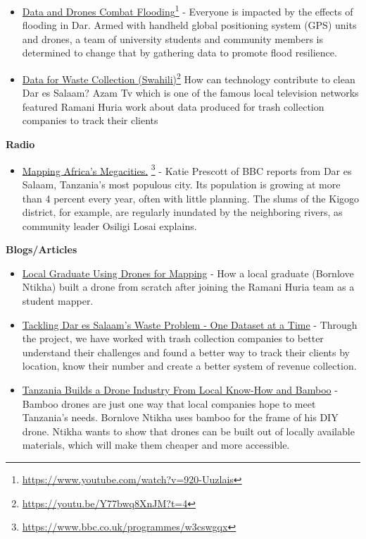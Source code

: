 \documentclass[a4paper,12pt,twoside]{article}
\begin{document}
\begin{itemize}
		\item \href{https://www.youtube.com/watch?v=920-Uuzlais}{Data and Drones Combat Flooding}\footnote{\url{https://www.youtube.com/watch?v=920-Uuzlais}}
		- Everyone is impacted by the effects of flooding in Dar. Armed with handheld global positioning system (GPS) units and drones, a team of university students and community members is determined to change that by gathering data to promote flood resilience.
		\item \href{https://youtu.be/Y77bwq8XnJM?t=4}{ Data for Waste Collection (Swahili)}\footnote{\url{https://youtu.be/Y77bwq8XnJM?t=4}}
		How can technology contribute to clean Dar es Salaam? Azam Tv which is one of the famous local television networks featured Ramani Huria work about data produced for trash collection companies to track their clients
	\end{itemize}

\newpage
\textbf{Radio}

	\begin{itemize}
		\item \href{https://www.bbc.co.uk/programmes/w3cswgqx}{Mapping Africa's Megacities.} \footnote{\url{https://www.bbc.co.uk/programmes/w3cswgqx}}
		- Katie Prescott of BBC reports from Dar es Salaam, Tanzania's most populous city. Its population is growing at more than 4 percent every year, often with little planning. The slums of the  Kigogo district, for example, are regularly inundated by the neighboring rivers, as community leader Osiligi Losai explains.
	\end{itemize}

\textbf{Blogs/Articles}

	\begin{itemize}
		\item \href{https://www.thecitizen.co.tz/magazine/success/-Local-graduate-using-drones-for-mapping/1843788-4967500-c6pj0rz/index.html}{Local Graduate Using Drones for Mapping}
		- How a local graduate (Bornlove Ntikha) built a drone from scratch after joining the Ramani Huria team as a student mapper.
		\item \href{https://www.ippmedia.com/en/features/hot-tackles-dar-es-salaamE28099s-waste-problem-one-dataset-time}{Tackling Dar es Salaam’s Waste Problem - One Dataset at a Time} 
		- Through the project, we have worked with trash collection companies to better understand their challenges and found a better way to track their clients by location, know their number and create a better system of revenue collection.
		\item \href{https://spectrum.ieee.org/robotics/drones/tanzanias-homegrown-drone-industry-takes-off-on-bamboo-wings}{ Tanzania Builds a Drone Industry From Local Know-How and Bamboo}
		- Bamboo drones are just one way that local companies hope to meet Tanzania’s needs. Bornlove Ntikha uses bamboo for the frame of his DIY drone. Ntikha wants to show that drones can be built out of locally available materials, which will make them cheaper and more accessible.
	\end{itemize}
\end{document}
